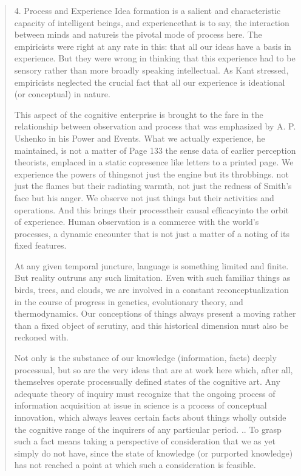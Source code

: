 \documentclass[a4paper]{Thesis}
\begin{document}
	\begin{quotation}
		4. Process and Experience
		Idea formation is a salient and characteristic capacity of intelligent beings, and
		experiencethat is to say, the interaction between minds and natureis the pivotal mode of
		process here. The empiricists were right at any rate in this: that all our ideas have a basis
		in experience. But they were wrong in thinking that this experience had to be sensory
		rather than more broadly speaking intellectual. As Kant stressed, empiricists neglected
		the crucial fact that all our experience is ideational (or conceptual) in nature.
		
		
		This aspect of the cognitive enterprise is brought to the fare in the relationship between
		observation and process that was emphasized by A. P. Ushenko in his Power and Events.
		What we actually experience, he maintained, is not a matter of
		Page 133
		the sense data of earlier perception theorists, emplaced in a static copresence like letters
		to a printed page. We experience the powers of thingsnot just the engine but its
		throbbings. not just the flames but their radiating warmth, not just the redness of Smith's
		face but his anger. We observe not just things but their activities and operations. And this
		brings their processtheir causal efficacyinto the orbit of experience. Human observation is
		a commerce with the world's processes, a dynamic encounter that is not just a matter of
		a noting of its fixed features.
		
		At any given temporal juncture, language is something limited and finite. But reality
		outruns any such limitation. Even with such familiar things as birds, trees, and clouds, we
		are involved in a constant reconceptualization in the course of progress in genetics,
		evolutionary theory, and thermodynamics. Our conceptions of things always present a
		moving rather than a fixed object of scrutiny, and this historical dimension must also be
		reckoned with.
		
		Not only is the substance of our knowledge (information, facts) deeply processual, but so
		are the very ideas that are at work here which, after all, themselves operate processually
		defined states of the cognitive art. Any adequate theory of inquiry must recognize that
		the ongoing process of information acquisition at issue in science is a process of
		conceptual innovation, which always leaves certain facts about things wholly outside the
		cognitive range of the inquirers of any particular period.
		..
		To
		grasp such a fact means taking a perspective of consideration that we as yet simply do
		not have, since the state of knowledge (or purported knowledge) has not reached a point
		at which such a consideration is feasible.	
		

\end{quotation}
\end{document}
